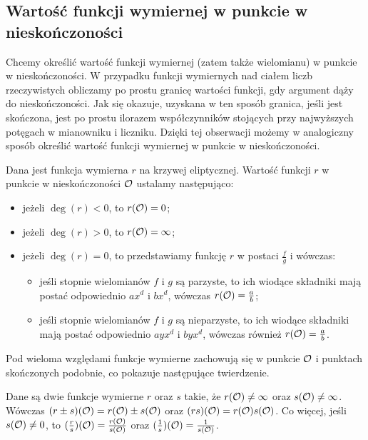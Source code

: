 \subsection*{Wartość funkcji wymiernej w punkcie w nieskończoności}

Chcemy określić wartość funkcji wymiernej (zatem także wielomianu)
w punkcie w nieskończoności.
W przypadku funkcji wymiernych nad ciałem liczb rzeczywistych
obliczamy po prostu granicę wartości funkcji,
gdy argument dąży do nieskończoności.
Jak się okazuje, uzyskana w ten sposób granica, jeśli jest skończona,
jest po prostu ilorazem współczynników stojących przy najwyższych potęgach
w mianowniku i liczniku.
Dzięki tej obserwacji możemy w analogiczny sposób określić
wartość funkcji wymiernej w punkcie w nieskończoności.

\begin{definition}
Dana jest funkcja wymierna $r$ na krzywej eliptycznej.
Wartość funkcji $r$ w punkcie w nieskończoności $\mathcal{O}$
ustalamy następująco:
\begin{itemize}
\item jeżeli $\deg(r) < 0$, to $r(\mathcal{O}) = 0$;
\item jeżeli $\deg(r) > 0$, to $r(\mathcal{O}) = \infty$;
\item jeżeli $\deg(r) = 0$,
to przedstawiamy funkcję $r$ w postaci $\frac{f}{g}$ i wówczas:
\begin{itemize}
\item jeśli stopnie wielomianów $f$ i $g$ są parzyste,
to ich wiodące składniki mają postać odpowiednio $ax^d$ i $bx^d$,
wówczas $r(\mathcal{O}) = \frac{a}{b}$;
\item jeśli stopnie wielomianów $f$ i $g$ są nieparzyste,
to ich wiodące składniki mają postać odpowiednio $ayx^d$ i $byx^d$,
wówczas również $r(\mathcal{O}) = \frac{a}{b}$.
\end{itemize}
\end{itemize}
\end{definition}

Pod wieloma względami funkcje wymierne zachowują się
w punkcie $\mathcal{O}$ i punktach skończonych podobnie,
co pokazuje następujące twierdzenie.

\begin{theorem}
Dane są dwie funkcje wymierne $r$ oraz $s$ takie,
że $r(\mathcal{O}) \neq \infty$ oraz $s(\mathcal{O}) \neq \infty$.
Wówczas $(r \pm s)(\mathcal{O}) = r(\mathcal{O}) \pm s(\mathcal{O})$
oraz $(rs)(\mathcal{O}) = r(\mathcal{O})s(\mathcal{O})$.
Co więcej, jeśli $s(\mathcal{O}) \neq 0$,
to $(\frac{r}{s})(\mathcal{O}) = \frac{r(\mathcal{O})}{s(\mathcal{O})}$
oraz $(\frac{1}{s})(\mathcal{O}) = \frac{1}{s(\mathcal{O})}$.
\end{theorem}

